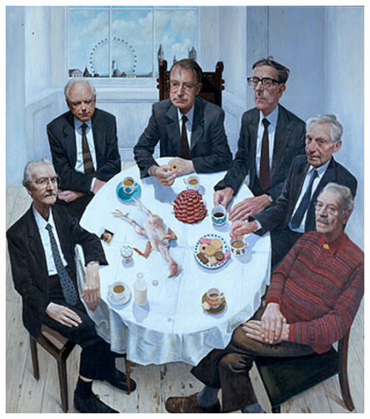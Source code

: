 \documentclass[12pt]{book}
\begin{document}
\includegraphics[height=\textheight]{stuartpearson}



\newpage \newpage
\end{document}
